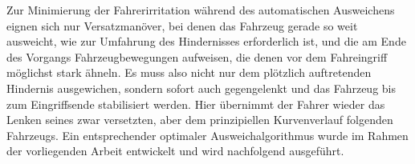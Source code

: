 


Zur Minimierung der Fahrerirritation während des automatischen Ausweichens eignen sich nur Versatzmanöver, bei denen das Fahrzeug gerade so weit ausweicht, wie zur Umfahrung des Hindernisses erforderlich ist, und die am Ende des Vorgangs Fahrzeugbewegungen aufweisen, die denen vor dem Fahreingriff möglichst stark ähneln. %
Es muss also nicht nur dem plötzlich auftretenden Hindernis ausgewichen, sondern sofort auch gegengelenkt und das Fahrzeug bis zum Eingriffsende stabilisiert werden. Hier übernimmt der Fahrer wieder das Lenken seines zwar versetzten, aber dem prinzipiellen Kurvenverlauf folgenden Fahrzeugs.
Ein entsprechender optimaler Ausweichalgorithmus wurde im Rahmen der vorliegenden Arbeit entwickelt  und wird nachfolgend ausgeführt.

